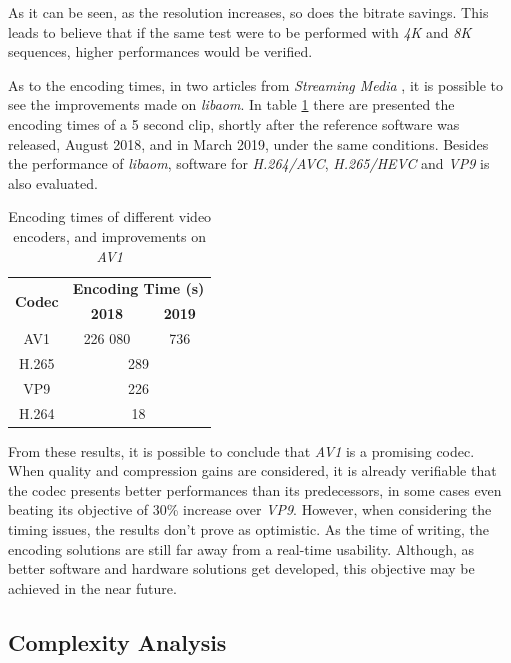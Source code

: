 As it can be seen, as the resolution increases, so does the bitrate savings. This leads to believe that if the same test were to be performed with \emph{4K} and \emph{8K} sequences, higher performances would be verified.

As to the encoding times, in two articles from \emph{Streaming Media} \cite{AV1FirstLook2018, GoodNewsAV12019}, it is possible to see the improvements made on \emph{libaom}. In table \ref{tab:testtime} there are presented the encoding times of a 5 second clip, shortly after the reference software was released, August 2018, and in March 2019, under the same conditions. Besides the performance of \emph{libaom}, software for \emph{H.264/AVC}, \emph{H.265/HEVC} and \emph{VP9} is also evaluated.

\begin{table}[h]
    \centering
    \begin{tabular}{@{}ccc@{}} \toprule
        \multirow{2}{*}{\textbf{Codec}}     &      \multicolumn{2}{c}{\textbf{Encoding Time (s)}} \\
         &    \textbf{2018}  &   \textbf{2019}  \\ \toprule
        AV1            &    226 080        & 736 \\
        H.265          &    \multicolumn{2}{c}{289} \\
        VP9            &    \multicolumn{2}{c}{226} \\
        H.264          &    \multicolumn{2}{c}{18} \\
        \bottomrule
    \end{tabular}
    \caption{Encoding times of different video encoders, and improvements on \emph{AV1}}
    \label{tab:testtime}
\end{table}

From these results, it is possible to conclude that \emph{AV1} is a promising codec. When quality and compression gains are considered, it is already verifiable that the codec presents better performances than its predecessors, in some cases even beating its objective of 30\% increase over \emph{VP9}. However, when considering the timing issues, the results don't prove as optimistic. As the time of writing, the encoding solutions are still far away from a real-time usability. Although, as better software and hardware solutions get developed, this objective may be achieved in the near future.

\subsection{Complexity Analysis}



\clearpage
\printbibliography[heading=subbibliography]
